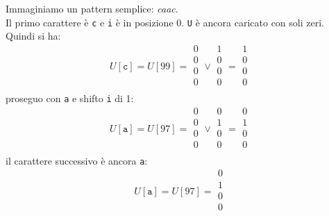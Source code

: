 \documentclass[a4paper,12pt, oneside]{article}
\begin{document}
\begin{esempio}
  Immaginiamo un pattern semplice: \textit{caac}.\\
  Il primo carattere è \texttt{c} e \texttt{i} è in posizione
  0. \texttt{U} è ancora caricato con soli zeri. Quindi si ha:
  \[
    U[\mathtt{c}]=U[99]=
    \begin{matrix}
      0\\
      0\\
      0\\
      0\\
    \end{matrix}\vee
    \begin{matrix}
      1\\
      0\\
      0\\
      0\\
    \end{matrix}=
    \begin{matrix}
      1\\
      0\\
      0\\
      0\\
    \end{matrix}
  \]
  proseguo con \texttt{a} e shifto \texttt{i} di 1:
  \[
    U[\mathtt{a}]=U[97]=
    \begin{matrix}
      0\\
      0\\
      0\\
      0\\
    \end{matrix}\vee
    \begin{matrix}
      0\\
      1\\
      0\\
      0\\
    \end{matrix}=
    \begin{matrix}
      0\\
      1\\
      0\\
      0\\
    \end{matrix}
  \]
  il carattere successivo è ancora \texttt{a}:
  \[
    U[\mathtt{a}]=U[97]=
    \begin{matrix}
      0\\
      1\\
      0\\
      0\\

\end{matrix}\]
\end{esempio}
\end{document}
